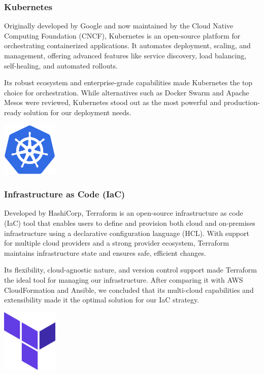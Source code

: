 \subsubsection{Kubernetes}
Originally developed by Google and now maintained by the Cloud Native Computing Foundation (CNCF), Kubernetes is an open-source platform for orchestrating containerized applications. It automates deployment, scaling, and management, offering advanced features like service discovery, load balancing, self-healing, and automated rollouts.\mynewline

Its robust ecosystem and enterprise-grade capabilities made Kubernetes the top choice for orchestration. While alternatives such as Docker Swarm and Apache Mesos were reviewed, Kubernetes stood out as the most powerful and production-ready solution for our deployment needs.

\begin{center}
    \centering
    \includegraphics[width=0.2\textwidth]{Images/Kubernetes Logo.png}
     \cite{kubernetes_logo}
    \label{fig:kubernetes_logo}
\end{center}

\subsubsection{Infrastructure as Code (IaC)}
Developed by HashiCorp, Terraform is an open-source infrastructure as code (IaC) tool that enables users to define and provision both cloud and on-premises infrastructure using a declarative configuration language (HCL). With support for multiple cloud providers and a strong provider ecosystem, Terraform maintains infrastructure state and ensures safe, efficient changes.\mynewline

Its flexibility, cloud-agnostic nature, and version control support made Terraform the ideal tool for managing our infrastructure. After comparing it with AWS CloudFormation and Ansible, we concluded that its multi-cloud capabilities and extensibility made it the optimal solution for our IaC strategy.

\begin{center}
    \centering
    \includegraphics[width=0.2\textwidth]{Images/Terraform Logo.png}
     \cite{terraform_logo}
    \label{fig:terraform_logo}
\end{center}

